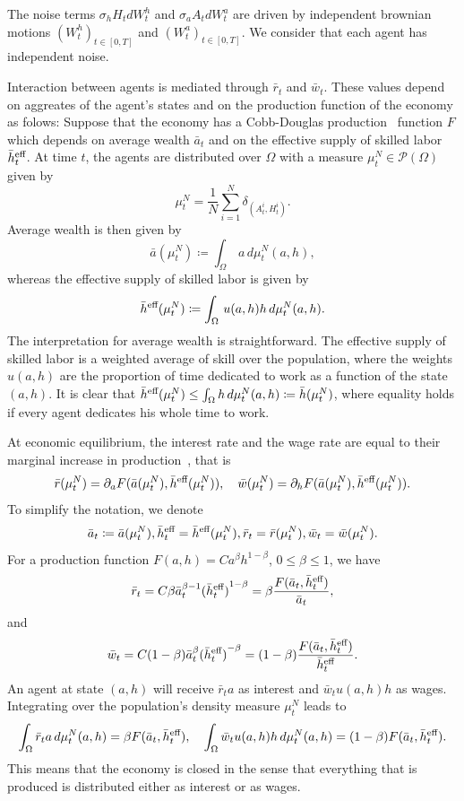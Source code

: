 The noise terms $\sigma_h H_t dW^h_t$ and $\sigma_a A_t dW^a_t$ are driven by independent brownian motions ${(W^h_t)}_{t \in [0,T]}$ and ${(W^a_t)}_{t \in [0,T]}$.
We consider that each agent has independent noise.

Interaction between agents is mediated through $\bar r_t$ and $\bar w_t$.
These values depend on aggreates of the agent's states and on the production function of the economy as folows:
Suppose that the economy has a Cobb-Douglas production~\cite{cobb1928theory} function $F$ which depends on average wealth $\bar a_t$ 
and on the effective supply of skilled labor $\bar h^{\text{eff}}_t$.
At time $t$, the agents are distributed over $\Omega$ with a measure $\mu^N_t \in \mathcal{P}(\Omega)$ given by
\[
\mu^N_t = \frac{1}{N} \sum_{i = 1}^N \delta_{(A^i_t, H^i_t)}.
\]
Average wealth is then given by
\[
\bar a(\mu^N_t) \coloneqq \int_\Omega \, a \, d\mu^N_t (a,h),
\]
whereas the effective supply of skilled labor is given by
\[
\bar h^{\text{eff}}(\mu^N_t) \coloneqq \int_\Omega \, u(a,h) h \, d\mu^N_t (a,h).
\]
The interpretation for average wealth is straightforward.
The effective supply of skilled labor is a weighted average of skill over the population, where the weights $u(a,h)$ are the proportion of time dedicated to work as a function of the state $(a,h)$.
It is clear that $\bar h^{\text{eff}}(\mu^N_t) \leq \int_\Omega  h \, d\mu^N_t (a,h) \coloneqq \bar h(\mu^N_t)$, where equality holds if every agent dedicates his whole time to work.

At economic equilibrium, the interest rate and the wage rate are equal to their marginal increase in production~\cite{cobb1928theory}, that is
\[
\bar r(\mu^N_t)= \partial_a F(\bar a(\mu^N_t), \bar h^{\text{eff}}(\mu^N_t)), \quad \bar w(\mu^N_t)= \partial_h F(\bar a(\mu^N_t), \bar h^{\text{eff}}(\mu^N_t)).
\]
To simplify the notation, we denote
\[
\bar a_t \coloneqq \bar a(\mu^N_t), \bar h^{\text{eff}}_t = \bar h^{\text{eff}}(\mu^N_t), \bar r_t = \bar r(\mu^N_t), \bar w_t = \bar w(\mu^N_t).
\]
For a production function $F(a,h) = C a^\beta h^{1 - \beta}$, $0 \leq \beta \leq 1$, we have
\[
\bar r_t = C \beta {\bar a_t}^{\beta - 1} {(\bar h^{\text{eff}}_t)}^{1 - \beta} = \beta \frac{F(\bar a_t, \bar h^{\text{eff}}_t)}{\bar a_t},
\]
and
\[
\bar w_t = C (1 - \beta) {\bar a}_t^{\beta} {({\bar h^{\text{eff}}}_t)}^{ - \beta} = (1 - \beta) \frac{F (\bar a_t, \bar h^{\text{eff}}_t)}{\bar h^{\text{eff}}_t}.
\]
An agent at state $(a,h)$ will receive $\bar r_t a$ as interest and $\bar w_t u(a,h) h$ as wages.
Integrating over the population's density measure $\mu^N_t$ leads to
\[
    \int_\Omega \bar r_t a \, d\mu^N_t(a,h) = \beta F(\bar a_t, \bar h^{\text{eff}}_t),\quad \int_\Omega \bar w_t u(a,h) h \, d\mu^N_t(a,h) = (1 - \beta) F(\bar a_t, \bar h^{\text{eff}}_t).    
\]
This means that the economy is closed in the sense that everything that is produced is distributed either as interest or as wages.

